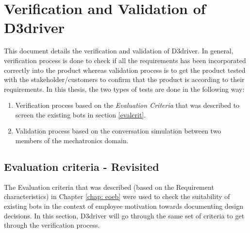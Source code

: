 \chapter{Verification and Validation of D3driver}
\label{chap: vod}

This document details the verification and validation of D3driver. In general, verification process is done to check if all the requirements has been incorporated correctly into the product whereas validation process is to get the product tested with the stakeholder/customers to confirm that the product is according to their requirements. In this thesis, the two types of tests are done in the following way:
\begin{enumerate}
\item Verification process based on the \textit{Evaluation Criteria} that was described to screen the existing bots in section \ref{evalcrit}.
\item Validation process based on the conversation simulation between two members of the mechatronics domain. 
\end{enumerate} 

\section{Evaluation criteria - Revisited}

The Evaluation criteria that was described (based on the Requirement characteristics) in Chapter \ref{chap: eoeb} were used to check the suitability of existing bots in the context of employee motivation towards documenting design decisions. In this section, D3driver will go through the same set of criteria to get through the verification process. 

